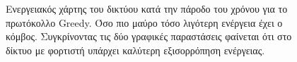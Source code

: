 \begin{figure}[H]
  \centering
  \caption{Ενεργειακός χάρτης του δικτύου κατά την πάροδο του χρόνου για το πρωτόκολλο Greedy. Όσο πιο μαύρο τόσο λιγότερη ενέργεια έχει ο κόμβος. Συγκρίνοντας τις
δύο
γραφικές παραστάσεις φαίνεται ότι στο δίκτυο με φορτιστή υπάρχει καλύτερη εξισορρόπηση ενέργειας.}
  \label{fig:1exp_4_1}
\end{figure}

